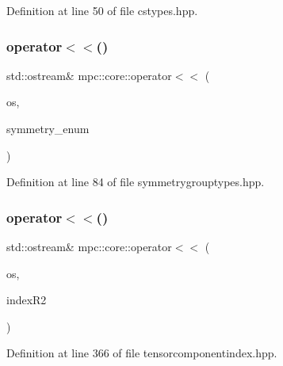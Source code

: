 Definition at line 50 of file cstypes.\+hpp.

\mbox{\label{namespacempc_1_1core_a372993ccd0fbeaef1367f7266160da4a}} 
\subsubsection{\texorpdfstring{operator$<$$<$()}{operator<<()}\hspace{0.1cm}{\footnotesize\ttfamily [2/4]}}
{\footnotesize\ttfamily std\+::ostream\& mpc\+::core\+::operator$<$$<$ (\begin{DoxyParamCaption}\item[{std\+::ostream \&}]{os,  }\item[{\mbox{\hyperlink{namespacempc_1_1core_a9d979684062547055a0ef5c13077bad8}{Symmetry\+Group\+Enumeration}}}]{symmetry\+\_\+enum }\end{DoxyParamCaption})\hspace{0.3cm}{\ttfamily [inline]}}



Definition at line 84 of file symmetrygrouptypes.\+hpp.

\mbox{\label{namespacempc_1_1core_aa9733db2c8b0b9cb9322fb2de46b09cb}} 
\subsubsection{\texorpdfstring{operator$<$$<$()}{operator<<()}\hspace{0.1cm}{\footnotesize\ttfamily [3/4]}}
{\footnotesize\ttfamily std\+::ostream\& mpc\+::core\+::operator$<$$<$ (\begin{DoxyParamCaption}\item[{std\+::ostream \&}]{os,  }\item[{\mbox{\hyperlink{classmpc_1_1core_1_1_tensor_rank_n_component_index}{Tensor\+Rank\+N\+Component\+Index}}$<$ 2 $>$}]{index\+R2 }\end{DoxyParamCaption})\hspace{0.3cm}{\ttfamily [inline]}}



Definition at line 366 of file tensorcomponentindex.\+hpp.

